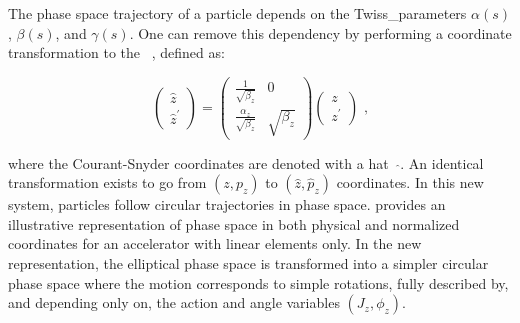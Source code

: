 The phase space trajectory of a particle depends on the \gls{Twiss_parameters} \(\alpha(s)\), \(\beta(s)\), and \(\gamma(s)\).
One can remove this dependency by performing a coordinate transformation to the ~\cite{BOOK:Bazzani:Normal_Form_Approach_Betatron_Motion}, defined as:

\begin{equation}
    \begin{pmatrix}
        \hat{z} \\
        \hat{z}^{\prime}
    \end{pmatrix}
    =
    \begin{pmatrix}
        \frac{1}{\sqrt{\beta_z}}         &  0 \\
        \frac{\alpha_z}{\sqrt{\beta_z}}  &  \sqrt{\beta_z}
    \end{pmatrix}
    \begin{pmatrix}
        z \\
        z^{\prime}
    \end{pmatrix} \text{ ,}
    \label{equation:physical_to_courant_snyder_coordinates}
\end{equation}
\vspace{1mm}

\noindent
where the Courant-Snyder coordinates are denoted with a hat \ \(\hat{ }\).
An identical transformation exists to go from \((z, p_z)\) to \((\hat{z}, \hat{p}_z)\) coordinates.
In this new system, particles follow circular trajectories in phase space.
 provides an illustrative representation of phase space in both physical and normalized coordinates for an accelerator with linear elements only.
In the new representation, the elliptical phase space is transformed into a simpler circular phase space where the motion corresponds to simple rotations, fully described by, and depending only on, the \gls{action} and angle variables \((J_z, \phi_z)\).
\vspace{3mm}

